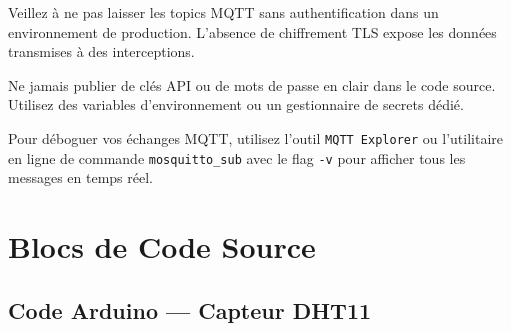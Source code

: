 \documentclass[12pt,a4paper]{report}
\begin{document}
\vspace{0.6em}

\begin{cardwarning}
    Veillez à ne pas laisser les topics MQTT sans authentification dans un environnement de production.
    L'absence de chiffrement TLS expose les données transmises à des interceptions.
\end{cardwarning}

\vspace{0.6em}

\begin{carddanger}
    Ne jamais publier de clés API ou de mots de passe en clair dans le code source.
    Utilisez des variables d'environnement ou un gestionnaire de secrets dédié.
\end{carddanger}

\vspace{0.6em}

\begin{cardtip}
    Pour déboguer vos échanges MQTT, utilisez l'outil \texttt{MQTT Explorer} ou l'utilitaire
    en ligne de commande \texttt{mosquitto\_sub} avec le flag \texttt{-v} pour afficher tous les
    messages en temps réel.
\end{cardtip}

\section{Blocs de Code Source}

\subsection{Code Arduino — Capteur DHT11}
\end{document}
